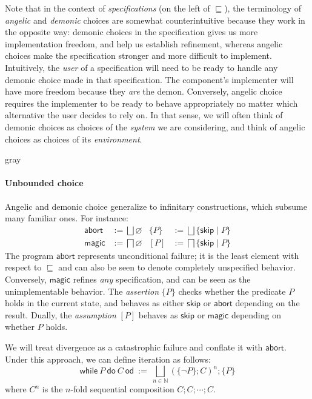 \documentclass[format=sigplan,authordraft]{acmart}
\newcommand{\kw}[1]{\ensuremath{ \mathsf{#1} }}
\begin{document}
Note that in the context of \emph{specifications}
(on the left of $\sqsubseteq$),
the terminology of \emph{angelic} and \emph{demonic}
choices are somewhat counterintuitive
because they work in the opposite way:
demonic choices in the specification gives us more
implementation freedom,
and help us establish refinement,
whereas angelic choices make the specification
stronger and more difficult to implement.
Intuitively,
the \emph{user} of a specification
will need to be ready to handle any demonic choice
made in that specification.
The component's implementer
will have more freedom because they \emph{are} the demon.
Conversely,
angelic choice requires the implementer to be
ready to behave appropriately
no matter which alternative the user decides to rely on.
In that sense,
we will often think of demonic choices as
choices of the \emph{system} we are considering,
and think of angelic choices as
choices of its \emph{environment}.


\begin{color}{gray}
\paragraph{Unbounded choice} %

Angelic and demonic choice
generalize to infinitary constructions,
which subsume many familiar ones.
For instance:
\begin{align*}
  \kw{abort} &:= \bigsqcup \varnothing &
  \{ P \} &:= \bigsqcup \{ \kw{skip} \mid P \} \\
  \kw{magic} &:= \bigsqcap \varnothing &
  [ P ] &:= \bigsqcap \{ \kw{skip} \mid P \}
\end{align*}
The program $\kw{abort}$ represents unconditional failure;
it is the least element with respect to $\sqsubseteq$
and can also be seen to denote completely unspecified behavior.
Conversely, $\kw{magic}$ refines \emph{any} specification,
and can be seen as the unimplementable behavior.
The \emph{assertion} $\{P\}$ checks whether
the predicate $P$ holds in the current state,
and behaves as either $\kw{skip}$ or $\kw{abort}$
depending on the result.
Dually, the \emph{assumption} $[P]$ behaves as
$\kw{skip}$ or $\kw{magic}$ depending on whether $P$ holds.

We will treat divergence as a catastrophic failure
and conflate it with \kw{abort}.
Under this approach,
we can define iteration as follows:
\[
  \kw{while} \: P \: \kw{do} \: C \: \kw{od} \: := \:
    \bigsqcup_{n \in \mathbb{N}}
    (\{\neg P\}; C)^n ; \{P\}
\]
where $C^n$ is the $n$-fold sequential composition
$C ; C ; \cdots ; C$.


\end{color}
\end{document}
